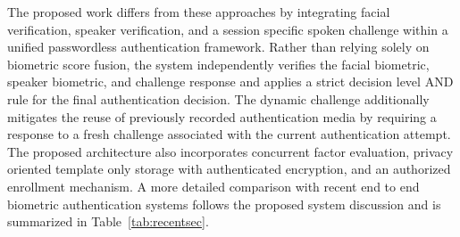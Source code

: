 \documentclass[runningheads]{llncs}
\begin{document}
The proposed work differs from these approaches by integrating facial verification, speaker verification, and a session specific spoken challenge within a unified passwordless authentication framework. Rather than relying solely on biometric score fusion, the system independently verifies the facial biometric, speaker biometric, and challenge response and applies a strict decision level AND rule for the final authentication decision. The dynamic challenge additionally mitigates the reuse of previously recorded authentication media by requiring a response to a fresh challenge associated with the current authentication attempt. The proposed architecture also incorporates concurrent factor evaluation, privacy oriented template only storage with authenticated encryption, and an authorized enrollment mechanism. A more detailed comparison with recent end to end biometric authentication systems follows the proposed system discussion and is summarized in Table~\ref{tab:recentsec}.
\end{document}
